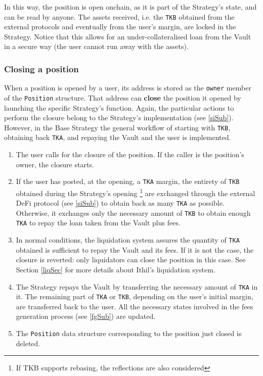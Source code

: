 \documentclass[a4paper,10 pt]{article}
\theoremstyle{definition}
\begin{document}
In this way, the position is open onchain, as it is part of the Strategy's state, and can be read by anyone. The assets received, i.e. the \verb|TKB| obtained from the external protocols and eventually from the user's margin, are locked in the Strategy. Notice that this allows for an under-collateralised loan from the Vault in a secure way (the user cannot run away with the assets). 

\subsubsection{Closing a position}\label{cpSubSub}

When a position is opened by a user, its address is stored as the \verb|owner| member of the \verb|Position| structure. That address can {\bf close} the position it opened by launching the specific Strategy's function. Again, the particular actions to perform the closure belong to the Strategy's implementation (see \ref{siSub}). However, in the Base Strategy the general workflow of starting with \verb|TKB|, obtaining back \verb|TKA|, and repaying the Vault and the user is implemented.

\begin{enumerate}
\item The user calls for the closure of the position. If the caller is the position's owner, the closure starts.
\item If the user has posted, at the opening, a \verb|TKA| margin, the entirety of \verb|TKB| obtained during the Strategy's opening \footnote{If TKB supports rebasing, the reflections are also considered} are exchanged through the external DeFi protocol (see \ref{siSub}) to obtain back as many \verb|TKA| as possible. Otherwise, it exchanges only the necessary amount of \verb|TKB| to obtain enough \verb|TKA| to repay the loan taken from the Vault plus fees.
\item In normal conditions, the liquidation system assures the quantity of \verb|TKA| obtained is sufficient to repay the Vault and its fees. If it is not the case, the closure is reverted: only liquidators can close the position in this case. See Section \ref{liqSec} for more details about Ithil's liquidation system.
\item The Strategy repays the Vault by transferring the necessary amount of \verb|TKA| in it. The remaining part of \verb|TKA| or \verb|TKB|, depending on the user's initial margin, are transferred back to the user. All the necessary states involved in the fees generation process (see \ref{fgSub}) are updated.
\item The \verb|Position| data structure corresponding to the position just closed is deleted.
\end{enumerate}
\end{document}
